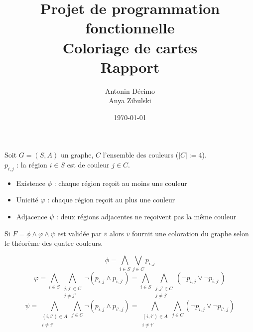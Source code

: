 \documentclass{article}
\begin{document}
\title{Projet de programmation fonctionnelle\\
Coloriage de cartes\\
Rapport}
\author{Antonin Décimo\\ Anya Zibulski}
\date{\today}
\maketitle

Soit $G = (S, A)$ un graphe, $C$ l'ensemble des couleurs ($|C| := 4$). \\
$p_{i, j}$ : la région $i \in S$ est de couleur $j \in C$.
\begin{itemize}
    \item Existence $\phi$ : chaque région reçoit au moins une couleur
    \item Unicité $\varphi$ : chaque région reçoit au plus une couleur
    \item Adjacence $\psi$ : deux régions adjacentes ne reçoivent pas la même couleur
\end{itemize}
Si $F = \phi \land \varphi \land \psi$ est validée par $\bar{v}$ alors $\bar{v}$
fournit une coloration du graphe selon le théorème des quatre couleurs.

$$\phi = \displaystyle\bigwedge_{i \in S}\displaystyle\bigvee_{j \in C} p_{i, j}$$
$$\varphi
  = \displaystyle\bigwedge_{i \in S}
    \bigwedge_{\substack{j, j' \in C \\
    j \neq j'}}
    \neg(p_{i,j} \land p_{i, j'})
  = \displaystyle\bigwedge_{i \in S}
    \bigwedge_{\substack{j, j' \in C \\
    j \neq j'}}
    (\neg p_{i,j} \lor \neg p_{i, j'})$$
$$\psi
  = \bigwedge_{\substack{(i, i') \in A \\
    i \neq i'}}
    \displaystyle\bigwedge_{j \in C}
    \neg(p_{i,j} \land p_{i', j})
  = \bigwedge_{\substack{(i, i') \in A \\
    i \neq i'}}
    \displaystyle\bigwedge_{j \in C}
    (\neg p_{i,j} \lor \neg p_{i', j})
    $$


\end{document}
